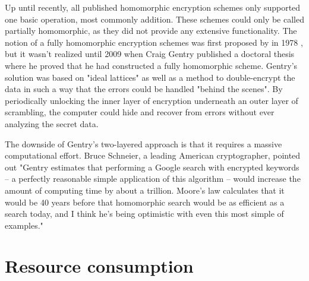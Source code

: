 Up until recently, all published homomorphic encryption schemes only supported one basic operation, most commonly addition. These schemes could only be called partially homomorphic, as they did not provide any extensive functionality. The notion of a  fully homomorphic encryption schemes was first proposed by \cite{rivest1978data} in 1978 , but it wasn't realized until 2009 when Craig Gentry published a doctoral thesis where he proved that he had constructed a fully homomorphic scheme\cite{gentry2009FHEpaper}. Gentry's solution was based on "ideal lattices" as well as a method to double-encrypt the data in such a way that the errors could be handled "behind the scenes". By periodically unlocking the inner layer of encryption underneath an outer layer of scrambling, the computer could hide and recover from errors without ever analyzing the secret data. 


The downside of Gentry's two-layered approach is that it requires a massive computational effort. Bruce Schneier, a leading American cryptographer, pointed out "Gentry estimates that performing a Google search with encrypted keywords -- a perfectly reasonable simple application of this algorithm -- would increase the amount of computing time by about a trillion. Moore's law calculates that it would be 40 years before that homomorphic search would be as efficient as a search today, and I think he's being optimistic with even this most simple of examples\citep{schneier2009blog}." 


\section{Resource consumption}


\cleardoublepage
